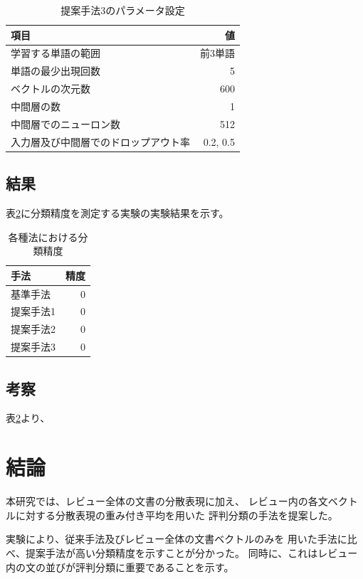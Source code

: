 \documentclass[twocolumn,a4paper]{ltjarticle}
\begin{document}
\begin{table}
  \caption{提案手法3のパラメータ設定}
  \begin{tabular}{l | r}\label{tab:ParametersOfMyMethod3}
    項目 & 値 \\
    \hline
    学習する単語の範囲 & 前3単語 \\
    単語の最少出現回数 & 5 \\
    ベクトルの次元数 & 600 \\
    中間層の数 & 1 \\
    中間層でのニューロン数 & 512 \\
    入力層及び中間層でのドロップアウト率 & 0.2, 0.5 \\
  \end{tabular}
\end{table}


\subsection{結果}

表\ref{tab:Accuracies}に分類精度を測定する実験の実験結果を示す。

\begin{table}
  \caption{各種法における分類精度}
  \begin{tabular}{l | r}\label{tab:Accuracies}
    手法 & 精度 \\
    \hline
    基準手法 & 0 \\
    提案手法1 & 0 \\
    提案手法2 & 0 \\
    提案手法3 & 0 \\
  \end{tabular}
\end{table}

\subsection{考察}

表\ref{tab:Accuracies}より、



\section{結論}

本研究では、レビュー全体の文書の分散表現に加え、
レビュー内の各文ベクトルに対する分散表現の重み付き平均を用いた
評判分類の手法を提案した。

実験により、従来手法\cite{fujitani15}及びレビュー全体の文書ベクトルのみを
用いた手法に比べ、提案手法が高い分類精度を示すことが分かった。
同時に、これはレビュー内の文の並びが評判分類に重要であることを示す。
\end{document}
